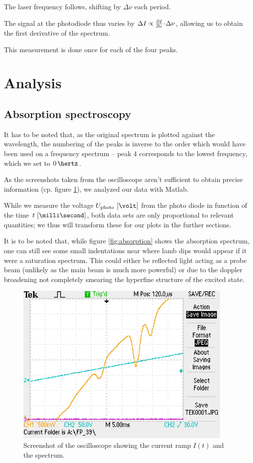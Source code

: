 The laser frequency follows, shifting by $\Delta \nu$ each period.

The signal at the photodiode thus varies by $\Delta I \propto \frac{\partial I}{\partial\nu} \!\cdot\! \Delta \nu$, allowing us to obtain the first derivative of the spectrum.

This measurement is done once for each of the four peaks.


\newpage
\section{Analysis}
\subsection{Absorption spectroscopy}

It has to be noted that, as the original spectrum is plotted against the wavelength, the numbering of the peaks is inverse to the order which would have been used on a frequency spectrum -- peak 4 corresponds to the lowest frequency, which we set to $0 \,\hertz$.

As the screenshots taken from the oscilloscope aren't sufficient to obtain precise information (cp. figure \ref{fig:oszi}), we analyzed our data with Matlab.

While we measure the voltage $U_\text{photo}~[\volt]$ from the photo diode in function of the time $t~[\milli\second]$, both data sets are only proportional to relevant quantities; we thus will transform these for our plots in the further sections.

It is to be noted that, while figure \ref{fig:absorption} shows the absorption spectrum, one can still see some small indentations near where lamb dips would appear if it were a saturation spectrum. This could either be reflected light acting as a probe beam (unlikely as the main beam is much more powerful) or due to the doppler broadening not completely smearing the hyperfine structure of the excited state.

\begin{figure}[h]
	\centering
	\includegraphics[width=0.95\textwidth]{data/TEK0001.jpg}
	\caption{Screenshot of the oscilloscope showing the current ramp $I(t)$ and the spectrum.}
	\label{fig:oszi}
	\vspace{-2em}
\end{figure}

